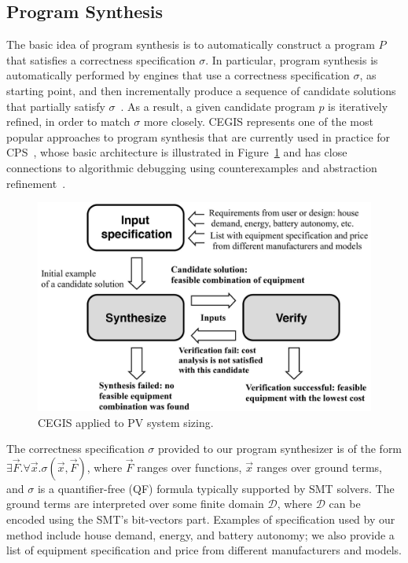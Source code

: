 \documentclass[review]{elsarticle}
\begin{document}
\subsection{Program Synthesis}
\label{sec:ProgramSynthesis}

The basic idea of program synthesis is to automatically construct a program $P$ that satisfies a correctness specification $\sigma$. In particular, program synthesis is automatically performed by engines that use a correctness specification $\sigma$, as starting point, and then incrementally produce a sequence of candidate solutions that partially satisfy $\sigma$~\cite{Abateetal2017}. As a result, a given candidate program $p$ is iteratively refined, in order to match $\sigma$ more closely. CEGIS represents one of the most popular approaches to program synthesis that are currently used in practice for CPS~\cite{Abateetal2017}, whose basic architecture is illustrated in Figure~\ref{Counter-Example-Guided-Inductive-Synthesis} and has close connections to algorithmic debugging using counterexamples and abstraction refinement~\cite{Alur}. 

\begin{figure}[h]
	\centering
	\includegraphics[width=0.75\columnwidth]{fig2_rev.jpg}
	\caption{CEGIS applied to PV system sizing.}
	\label{Counter-Example-Guided-Inductive-Synthesis}
\end{figure}

The correctness specification $\sigma$ provided to our program synthesizer is of the form $\exists \vec{F} .  \forall \vec{x}.  \sigma(\vec{x}, \vec{F})$, where $\vec{F}$ ranges over functions, $\vec{x}$ ranges over ground terms, and $\sigma$ is a quantifier-free (QF) formula typically supported by SMT solvers. The ground terms are interpreted over some finite domain $\mathcal{D}$, where $\mathcal{D}$ can be encoded using the SMT's bit-vectors part. Examples of specification used by our method include house demand, energy, and battery autonomy; we also provide a list of equipment specification and price from different manufacturers and models.
\end{document}
